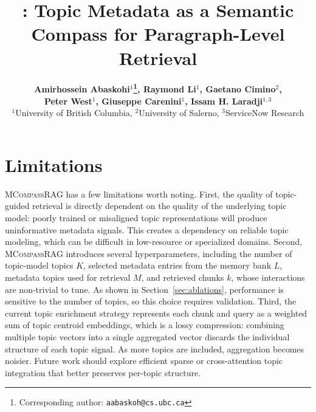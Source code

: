 \documentclass[11pt]{article}
\title{\logo \name{}: Topic Metadata as a Semantic Compass for Paragraph-Level Retrieval}
\author{
\textbf{
Amirhossein Abaskohi$^{1}$\thanks{Corresponding author: \texttt{aabaskoh@cs.ubc.ca}},
Raymond Li$^{1}$,
Gaetano Cimino$^{2}$,}\\
\textbf{
Peter West$^{1}$,
Giuseppe Carenini$^{1}$,
Issam H. Laradji$^{1,3}$}\\[0.5em]
$^{1}$University of British Columbia, $^{2}$University of Salerno, $^{3}$ServiceNow Research 
}
\newcommand{\name}[1]{\textsc{MCompassRAG}\xspace}
\begin{document}
\maketitle











\section*{Limitations}
\name{} has a few limitations worth noting. First, the quality of topic-guided retrieval is directly dependent on the quality of the underlying topic model: poorly trained or misaligned topic representations will produce uninformative metadata signals. This creates a dependency on reliable topic modeling, which can be difficult in low-resource or specialized domains. Second, \name{} introduces several hyperparameters, including the number of topic-model topics $K$, selected metadata entries from the memory bank $L$, metadata topics used for retrieval $M$, and retrieved chunks $k$, whose interactions are non-trivial to tune. As shown in Section~\ref{sec:ablations}, performance is sensitive to the number of topics, so this choice requires validation. Third, the current topic enrichment strategy represents each chunk and query as a weighted sum of topic centroid embeddings, which is a lossy compression: combining multiple topic vectors into a single aggregated vector discards the individual structure of each topic signal. As more topics are included, aggregation becomes noisier. Future work should explore efficient sparse or cross-attention topic integration that better preserves per-topic structure.





\clearpage

\appendix








\end{document}

